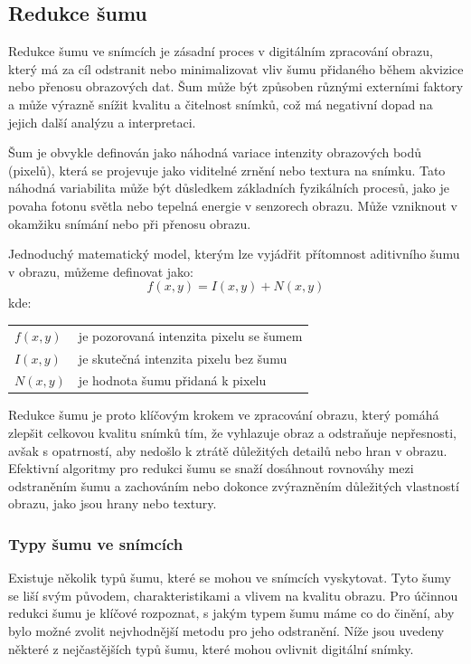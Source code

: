 \documentclass[male,czech,api_ing]{thesis}
\makeatletter
\newenvironment{conditions}[1][kde:]
    {#1 \begin{tabular}[t]{>{$}l<{$} @{${}={}$} >{\raggedright\arraybackslash}p{10cm}}}
    {\end{tabular}}
\makeatother
\begin{document}
\subsection{Redukce šumu}
Redukce šumu ve snímcích je zásadní proces v digitálním zpracování obrazu, který má za cíl odstranit nebo minimalizovat vliv šumu přidaného během akvizice nebo přenosu obrazových dat. Šum může být způsoben různými externími faktory a může výrazně snížit kvalitu a čitelnost snímků, což má negativní dopad na jejich další analýzu a interpretaci.

Šum je obvykle definován jako náhodná variace intenzity obrazových bodů (pixelů), která se projevuje jako viditelné zrnění nebo textura na snímku. Tato náhodná variabilita může být důsledkem základních fyzikálních procesů, jako je povaha fotonu světla nebo tepelná energie v senzorech obrazu. Může vzniknout v okamžiku snímání nebo při přenosu obrazu.

Jednoduchý matematický model, kterým lze vyjádřit přítomnost aditivního šumu v obrazu, můžeme definovat jako:
\begin{equation}
    f(x, y) = I(x, y) + N(x, y)
\end{equation}
\begin{conditions}
    f(x, y) & je pozorovaná intenzita pixelu se šumem \\
    I(x, y) & je skutečná intenzita pixelu bez šumu \\
    N(x, y) & je hodnota šumu přidaná k pixelu
\end{conditions}

Redukce šumu je proto klíčovým krokem ve zpracování obrazu, který pomáhá zlepšit celkovou kvalitu snímků tím, že vyhlazuje obraz a odstraňuje nepřesnosti, avšak s opatrností, aby nedošlo k ztrátě důležitých detailů nebo hran v obrazu. Efektivní algoritmy pro redukci šumu se snaží dosáhnout rovnováhy mezi odstraněním šumu a zachováním nebo dokonce zvýrazněním důležitých vlastností obrazu, jako jsou hrany nebo textury. \cite{ImageDenoisingTechniques,ImageNoiseReductionIran}

\subsubsection{Typy šumu ve snímcích}
Existuje několik typů šumu, které se mohou ve snímcích vyskytovat. Tyto šumy se liší svým původem, charakteristikami a vlivem na kvalitu obrazu. Pro účinnou redukci šumu je klíčové rozpoznat, s jakým typem šumu máme co do činění, aby bylo možné zvolit nejvhodnější metodu pro jeho odstranění. Níže jsou uvedeny některé z nejčastějších typů šumu, které mohou ovlivnit digitální snímky.
\end{document}
